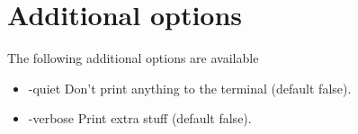 \section{Additional options}

The following additional options are available

\begin{itemize}

\item -quiet 
\newline \newline Don't print anything to the terminal (default false). 

\item -verbose
\newline \newline Print extra stuff (default false). 

\end{itemize}



